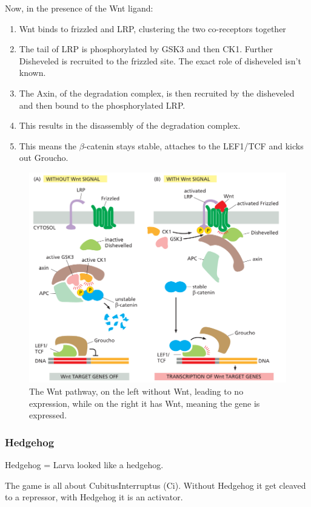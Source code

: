 \documentclass[../main.tex]{subfiles}
\begin{document}
Now, in the presence of the Wnt ligand:
\begin{enumerate}
	\item Wnt binds to frizzled and LRP, clustering the two co-receptors together
	\item The tail of LRP is phosphorylated by GSK3 and then CK1. Further \gls{Disheveled} is recruited to the \gls{frizzled} site. The exact role of disheveled isn't known.
	\item The \gls{Axin}, of the degradation complex, is then recruited by the disheveled and then bound to the phosphorylated LRP.
	\item This results in the disassembly of the degradation complex.
	\item This means the $\beta$-catenin stays stable, attaches to the LEF1/TCF and kicks out Groucho.
\end{enumerate}

\begin{figure}[H]
	\centering
	\includegraphics[width=0.7\linewidth]{Wnt_path}
	\caption{The Wnt pathway, on the left without Wnt, leading to no expression, while on the right it has Wnt, meaning the gene is expressed.}
\end{figure}


\subsubsection{Hedgehog}
\gls{Hedgehog} = Larva looked like a hedgehog.

The game is all about \gls{CubitusInterruptus} (Ci). Without Hedgehog it get cleaved to a repressor, with Hedgehog it is an activator. \\
\end{document}
